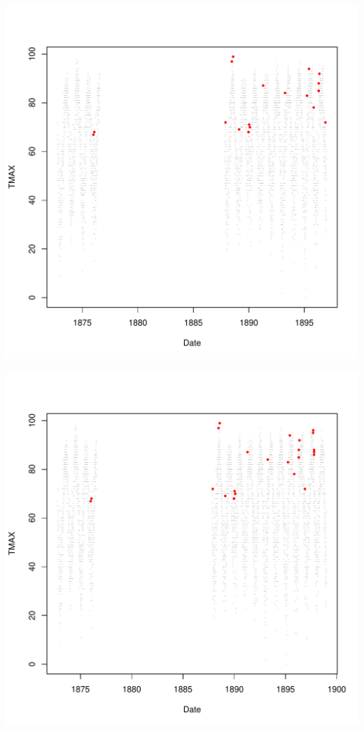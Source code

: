 \documentclass{article}\usepackage[]{graphicx}\usepackage[]{color}
\makeatletter
\def\maxwidth{ %
  \ifdim\Gin@nat@width>\linewidth
    \linewidth
  \else
    \Gin@nat@width
  \fi
}
\newenvironment{knitrout}{}{} %
\makeatother
\begin{document}
\begin{knitrout}
\includegraphics[width=\maxwidth]{figure/unnamed-chunk-4-8} 

\includegraphics[width=\maxwidth]{figure/unnamed-chunk-4-9} 


\end{knitrout}
\end{document}
